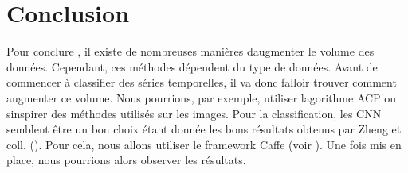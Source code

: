 \documentclass[11pt]{sdm}
\begin{document}
\bigbreak
\bigbreak
\section{Conclusion}
Pour conclure , il existe de nombreuses mani\`eres d\textquotesingle augmenter le volume des donn\'ees. Cependant, ces m\'ethodes d\'ependent du type de donn\'ees. Avant de commencer \`a classifier des s\'eries temporelles, il va donc falloir trouver comment augmenter ce volume. Nous pourrions, par exemple, utiliser l\textquotesingle agorithme ACP ou s\textquotesingle inspirer des m\'ethodes utilis\'es sur les images.
Pour la classification, les CNN semblent \^etre un bon choix \'etant donn\'ee les bons r\'esultats obtenus par Zheng et coll. (\cite{zheng2014time}). Pour cela, nous allons utiliser le framework Caffe (voir \cite{jia2014caffe}). Une fois mis en place, nous pourrions alors observer les r\'esultats.



\nocite{*}


\end{document}
